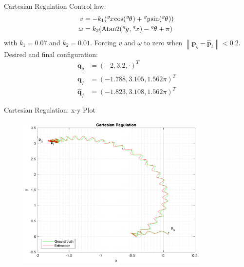 \documentclass[10pt]{beamer}
\begin{document}
    \begin{frame}{Cartesian Regulation}
        \justifying
        Control law:
        \begin{align*}
            v &= -k_1 (\tensor[^g]{x}{} \text{cos}(\tensor[^g]{\theta}{}) + \tensor[^g]{y}{} \text{sin}(\tensor[^g]{\theta}{})) \\
            \omega &=  k_2 (\text{Atan2}(\tensor[^g]{y}{}, \tensor[^g]{x}{}) - \tensor[^g]{\theta}{} + \pi)
        \end{align*}
        with $k_1 = 0.07$ and $k_2 = 0.01$. Forcing $v$ and $\omega$ to zero when
        $\left\|\bm{p}_g - \bm{\hat{p}}_t \right\| < 0.2$.
        Desired and final configuration:
        \begin{align*}
            \bm{q}_g &= (-2, 3.2, \cdot)^T \\
            \bm{q}_f &= (-1.788, 3.105, 1.562\pi)^T \\
            \bm{\hat{q}}_f &= (-1.823, 3.108, 1.562\pi)^T
        \end{align*}
    \end{frame}

    \begin{frame}{Cartesian Regulation: x-y Plot}
        \begin{figure}
            \includegraphics[width=0.85\textwidth]{images/cartesian_regulation.png}
        \end{figure}
    \end{frame}
\end{document}
